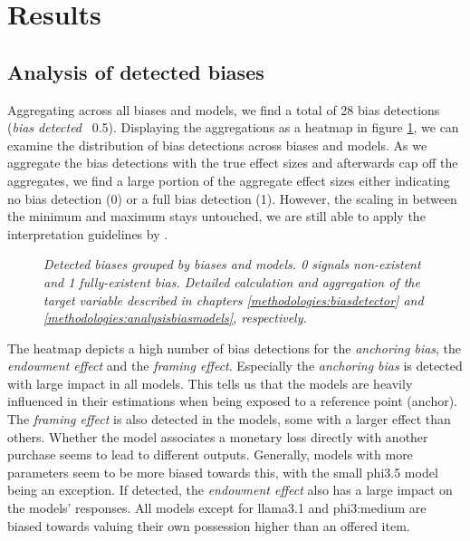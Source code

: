 \section{Results}
\subsection{Analysis of detected biases}
\par Aggregating across all biases and models, we find a total of 28 bias detections (\textit{bias detected} \geq\, 0.5). Displaying the aggregations as a heatmap in figure \ref{fig:detections-heatmap}, we can examine the distribution of bias detections across biases and models. As we aggregate the bias detections with the true effect sizes and afterwards cap off the aggregates, we find a large portion of the aggregate effect sizes either indicating no bias detection (0) or a full bias detection (1). However, the scaling in between the minimum and maximum stays untouched, we are still able to apply the interpretation guidelines by \textcite{cohen1988statistical}.

\begin{figure}[htbp]
    \centering
    
    \caption[Heatmap of bias detections grouped by biases and models]{\centering \textit{Detected biases grouped by biases and models. 0 signals non-existent and 1 fully-existent bias. Detailed calculation and aggregation of the target variable described in chapters \ref{methodologies:biasdetector} and \ref{methodologies:analysisbiasmodels}, respectively.}}
    \label{fig:detections-heatmap}
\end{figure}

\par The heatmap depicts a high number of bias detections for the \textit{anchoring bias}, the \textit{endowment effect} and the \textit{framing effect}. Especially the \textit{anchoring bias} is detected with large impact in all models. This tells us that the models are heavily influenced in their estimations when being exposed to a reference point (anchor). The \textit{framing effect} is also detected in the models, some with a larger effect than others. Whether the model associates a monetary loss directly with another purchase seems to lead to different outputs. Generally, models with more parameters seem to be more biased towards this, with the small phi3.5 model being an exception. If detected, the \textit{endowment effect} also has a large impact on the models' responses. All models except for llama3.1 and phi3:medium are biased towards valuing their own possession higher than an offered item.

